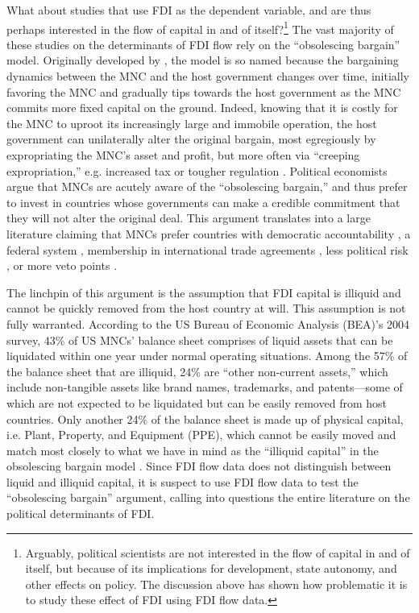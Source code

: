 What about studies that use FDI as the dependent variable, and are thus perhaps
interested in the flow of capital in and of itself?\footnote{Arguably, political
  scientists are not interested in the flow of capital in and of itself, but
  because of its implications for development, state autonomy, and other effects
  on policy. The discussion above has shown how problematic it is to study these
  effect of FDI using FDI flow data.} The vast majority of these studies on the
determinants of FDI flow rely on the ``obsolescing bargain'' model. Originally
developed by \citet{Vernon1971}, the model is so named because the bargaining
dynamics between the MNC and the host government changes over time, initially
favoring the MNC and gradually tips towards the host government as the MNC
commits more fixed capital on the ground. Indeed, knowing that it is costly for
the MNC to uproot its increasingly large and immobile operation, the host
government can unilaterally alter the original bargain, most egregiously by
expropriating the MNC's asset and profit, but more often via ``creeping
expropriation,'' e.g. increased tax or tougher regulation \citep{Li2009a}.
Political economists argue that MNCs are acutely aware of the ``obsolescing
bargain,'' and thus prefer to invest in countries whose governments can make a
credible commitment that they will not alter the original deal. This argument
translates into a large literature claiming that MNCs prefer countries with
democratic accountability \citep{Jensen2003}, a federal system
\citep{Jensen2005}, membership in international trade agreements
\citep{Buthe2008}, less political risk \citep{Beazer2011, Graham2010}, or more
veto points \citep{Choi2008}.

The linchpin of this argument is the assumption that FDI capital is illiquid and
cannot be quickly removed from the host country at will. This assumption is not
fully warranted. According to the US Bureau of Economic Analysis (BEA)'s 2004
survey, 43\% of US MNCs' balance sheet comprises of liquid assets that can be
liquidated within one year under normal operating situations. Among the 57\% of
the balance sheet that are illiquid, 24\% are ``other non-current assets,''
which include non-tangible assets like brand names, trademarks, and
patents---some of which are not expected to be liquidated but can be easily
removed from host countries. Only another 24\% of the balance sheet is made up
of physical capital, i.e. Plant, Property, and Equipment (PPE), which cannot be
easily moved and match most closely to what we have in mind as the ``illiquid
capital'' in the obsolescing bargain model \citep[113]{Kerner2014a}. Since FDI
flow data does not distinguish between liquid and illiquid capital, it is
suspect to use FDI flow data to test the ``obsolescing bargain'' argument,
calling into questions the entire literature on the political determinants of
FDI.

